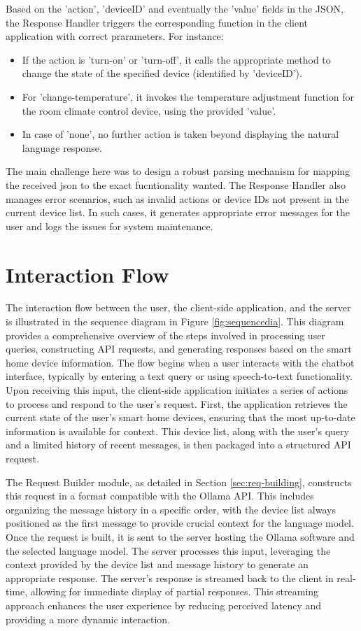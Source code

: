 Based on the 'action', 'deviceID' and eventually the 'value' fields in the JSON, the Response Handler triggers the corresponding function in the client application with correct prarameters. For instance:

\begin{itemize}
\item If the action is 'turn-on' or 'turn-off', it calls the appropriate method to change the state of the specified device (identified by 'deviceID').
\item For 'change-temperature', it invokes the temperature adjustment function for the room climate control device, using the provided 'value'.
\item In case of 'none', no further action is taken beyond displaying the natural language response.
\end{itemize}

The main challenge here was to design a robust parsing mechanism for mapping the received json to the exact fucntionality wanted.
The Response Handler also manages error scenarios, such as invalid actions or device IDs not present in the current device list. In such cases, it generates appropriate error messages for the user and logs the issues for system maintenance.

\section{Interaction Flow}
The interaction flow between the user, the client-side application, and the server is illustrated in the sequence diagram in Figure \ref{fig:sequencedia}. This diagram provides a comprehensive overview of the steps involved in processing user queries, constructing API requests, and generating responses based on the smart home device information.
The flow begins when a user interacts with the chatbot interface, typically by entering a text query or using speech-to-text functionality. Upon receiving this input, the client-side application initiates a series of actions to process and respond to the user's request.
First, the application retrieves the current state of the user's smart home devices, ensuring that the most up-to-date information is available for context. This device list, along with the user's query and a limited history of recent messages, is then packaged into a structured API request.

The Request Builder module, as detailed in Section \ref{sec:req-building}, constructs this request in a format compatible with the Ollama API. This includes organizing the message history in a specific order, with the device list always positioned as the first message to provide crucial context for the language model.
Once the request is built, it is sent to the server hosting the Ollama software and the selected language model. The server processes this input, leveraging the context provided by the device list and message history to generate an appropriate response.
The server's response is streamed back to the client in real-time, allowing for immediate display of partial responses. This streaming approach enhances the user experience by reducing perceived latency and providing a more dynamic interaction.

